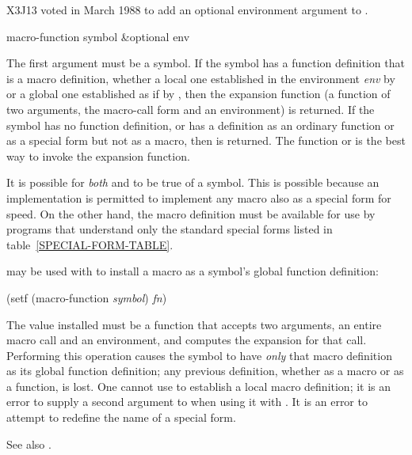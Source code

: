 \begin{newer}
X3J13 voted in March 1988 
to add an optional environment argument to .

\begin{defun}[Function]
macro-function symbol &optional env

The first argument must be a symbol.  If the symbol has a function definition
that is a macro definition, whether a local one established in the
environment \emph{env} by  or a global one established as
if by ,
then the expansion function
(a function of two arguments, the macro-call form and an environment)
is returned.
If the symbol has no function definition, or has a definition
as an ordinary function or as a special form but not as a macro, then
{\false} is returned.  The function  or 
is the best way to invoke the expansion function.

It is possible for \emph{both}  and 
to be true of a symbol.  This is possible because an implementation is
permitted to implement any macro also as a special form for speed.
On the other hand, the macro definition must be available
for use by programs that understand only the standard special forms
listed in table~\ref{SPECIAL-FORM-TABLE}.

 may be used with  to install
a macro as a symbol's global function definition:
\begin{lisp}
(setf (macro-function \emph{symbol}) \emph{fn})
\end{lisp}
The value installed must be a function that accepts two arguments,
an entire macro call and an environment, and computes the expansion for that call.
Performing this operation causes the symbol to have \emph{only} that
macro definition as its global function definition; any previous
definition, whether as a macro or as a function, is lost.
One cannot use  to establish a local macro definition;
it is an error to supply a second argument to 
when using it with .
It is an error to attempt to redefine the name of a special form.

See also .
\end{defun}
\end{newer}

